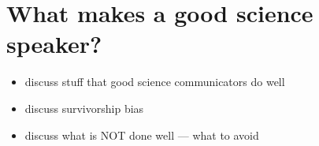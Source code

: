 \section{What makes a good science speaker?} \label{discussion}

\begin{itemize}
	\item discuss stuff that good science communicators do well
	\item discuss survivorship bias
	\item discuss what is NOT done well --- what to avoid
\end{itemize}
